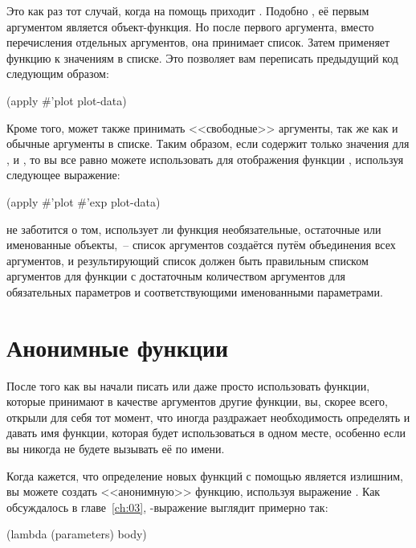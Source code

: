 Это как раз тот случай, когда на помощь приходит .  Подобно , её
первым аргументом является объект-функция.  Но после первого аргумента, вместо
перечисления отдельных аргументов, она принимает список.  Затем  применяет
функцию к значениям в списке.  Это позволяет вам переписать предыдущий код следующим
образом:

\begin{myverb}
  (apply #'plot plot-data)
\end{myverb}

Кроме того,  может также принимать <<свободные>> аргументы, так же как и обычные
аргументы в списке. Таким образом, если  содержит только значения для
,  и , то вы все равно можете использовать  для
отображения функции , используя следующее выражение:

\begin{myverb}
  (apply #'plot #'exp plot-data)
\end{myverb}

 не заботится о том, использует ли функция необязательные, остаточные или
именованные объекты,~-- список аргументов создаётся путём объединения всех аргументов, и
результирующий список должен быть правильным списком аргументов для функции с достаточным
количеством аргументов для обязательных параметров и соответствующими именованными
параметрами.

\section{Анонимные функции}

После того как вы начали писать или даже просто использовать функции, которые принимают в
качестве аргументов другие функции, вы, скорее всего, открыли для себя тот момент, что
иногда раздражает необходимость определять и давать имя функции, которая будет
использоваться в одном месте, особенно если вы никогда не будете вызывать её по имени.

Когда кажется, что определение новых функций с помощью  является излишним, вы
можете создать <<анонимную>> функцию, используя выражение .  Как обсуждалось в
главе~\ref{ch:03}, -выражение выглядит примерно так:

\begin{myverb}
  (lambda (parameters) body)
\end{myverb}

